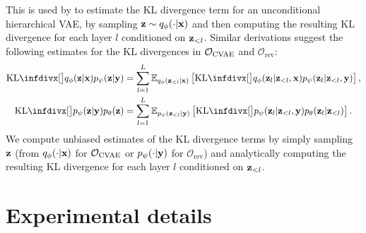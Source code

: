 This is used by \citet{vahdat2020nvae,child2020very} to estimate the KL
divergence term for an unconditional hierarchical VAE, by sampling ${\mathbf{z}}\sim
q_\phi(\cdot|{\mathbf{x}})$ and then computing the resulting KL divergence for each layer $l$
conditioned on ${\mathbf{z}}_{<l}$. Similar derivations suggest the following estimates for
the KL divergences in ${\mathcal{O}}_\text{CVAE}$ and $\mathcal{O}_\text{rev}$:
\begin{align}
  \kl[\big]{q_\phi(\rvz|\rvx)}{p_\psi(\rvz|\rvy)} &= \sum_{l=1}^L \EX_{q_\phi(\rvz_{<l}|\rvx)} \left[ \kl[\big]{q_\phi(\rvz_l|\rvz_{<l}, \rvx)}{p_\psi(\rvz_l|\rvz_{<l}, \rvy)} \right], \\
  \kl[\big]{p_\psi(\rvz|\rvy)}{p_\theta(\rvz)} &= \sum_{l=1}^L \EX_{p_\psi(\rvz_{<l}|\rvy)} \left[ \kl[\big]{p_\psi(\rvz_l|\rvz_{<l}, \rvy)}{p_\theta(\rvz_l|\rvz_{<l})} \right].
\end{align}
We compute unbiased estimates of the KL divergence terms by simply sampling ${\mathbf{z}}$
(from $q_\phi(\cdot|{\mathbf{x}})$ for ${\mathcal{O}}_\text{CVAE}$ or
$p_\psi(\cdot|{\mathbf{y}})$ for $\mathcal{O}_\text{rev}$) and analytically
computing the resulting KL divergence for each layer $l$ conditioned on
${\mathbf{z}}_{<l}$.


\section{Experimental details} \label{supp:cigcvae-exp-details}

